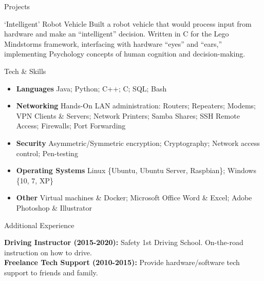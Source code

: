 \documentclass[]{mcdowellcv}
\begin{document}
\begin{cvsection}{Projects}
		\begin{cvsubsection}{‘Intelligent’ Robot Vehicle}{}
			Built a robot vehicle that would process input from hardware and make an “intelligent” decision. \newline  
			Written in C for the Lego Mindstorms framework, interfacing with hardware “eyes” and “ears,” \newline 
			implementing Psychology concepts of human cognition and decision-making. 
		\end{cvsubsection}
	\end{cvsection}
	
	\begin{cvsection}{Tech \& Skills}
		\begin{cvsubsection}{}{}
			\begin{itemize}[itemsep=6pt]
				\item \textbf{Languages} Java; Python; C++; C; SQL; Bash 
				\item \textbf{Networking} Hands-On LAN administration: Routers; Repeaters; Modems; VPN Clients \& Servers; Network Printers; Samba Shares; SSH Remote Access; Firewalls; Port Forwarding 
				\item \textbf{Security} Asymmetric/Symmetric encryption; Cryptography; Network access control; Pen-testing
				\item \textbf{Operating Systems} Linux \{Ubuntu, Ubuntu Server, Raspbian\}; Windows \{10, 7, XP\}
				\item \textbf{Other} Virtual machines \& Docker; Microsoft Office Word \& Excel; Adobe Photoshop \& Illustrator
			\end{itemize}
		\end{cvsubsection}
	\end{cvsection}
	
	\begin{cvsection}{Additional Experience}
		\begin{cvsubsection}{}{}	
			\textbf{Driving Instructor (2015-2020):} Safety 1st Driving School. On-the-road instruction on how to drive.\\
			\textbf{Freelance Tech Support (2010-2015):} Provide hardware/software tech support to friends and family.
		\end{cvsubsection}
	\end{cvsection}
	
\end{document}
